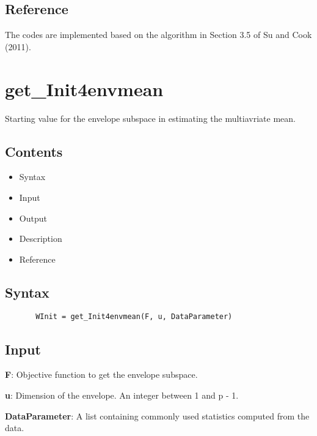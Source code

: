 \documentclass[a4paper,11pt,openany]{memoir}
\begin{document}
\subsection*{Reference}

\begin{par}
The codes are implemented based on the algorithm in Section 3.5 of Su and Cook (2011).
\end{par} \vspace{1em}

\newpage

\rmfamily
\color{black}\section{get\_Init4envmean}

\begin{par}
Starting value for the envelope subspace in estimating the multiavriate mean.
\end{par} \vspace{1em}

\subsection*{Contents}

\begin{itemize}
\setlength{\itemsep}{-1ex}
   \item Syntax
   \item Input
   \item Output
   \item Description
   \item Reference
\end{itemize}


\subsection*{Syntax}


\begin{verbatim}       WInit = get_Init4envmean(F, u, DataParameter)\end{verbatim}
    

\subsection*{Input}

\begin{par}
\textbf{F}: Objective function to get the envelope subspace.
\end{par} \vspace{1em}
\begin{par}
\textbf{u}: Dimension of the envelope. An integer between 1 and p - 1.
\end{par} \vspace{1em}
\begin{par}
\textbf{DataParameter}: A list containing commonly used statistics computed from the data.
\end{par} \vspace{1em}
\end{document}
